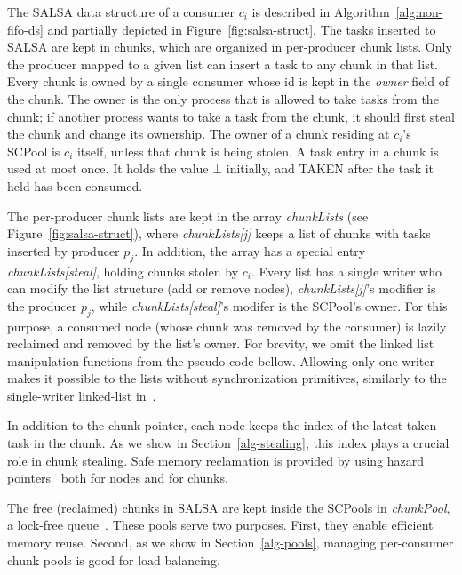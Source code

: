 The SALSA data structure of a consumer $c_i$ is described in Algorithm~\ref{alg:non-fifo-ds} and partially depicted in Figure~\ref{fig:salsa-struct}. 
The tasks inserted to SALSA are kept in chunks, which are organized in per-producer chunk lists. Only the producer mapped to a given list can insert a task to any chunk in that list. Every chunk is owned by a single consumer whose id is kept in the \emph{owner} field of the chunk.
The owner is the only process that is allowed to take tasks from the chunk; if another process wants to take a task from the chunk, it should first steal the chunk and change its ownership. The owner of a chunk
residing at $c_i$'s SCPool is $c_i$ itself, unless that chunk is being stolen. A task entry in a chunk is used at most once. It holds the value $\bot$ initially, and TAKEN after the task it held has been consumed.

The per-producer chunk lists are kept in the array \emph{chunkLists} (see Figure~\ref{fig:salsa-struct}), where \emph{chunkLists[j]} keeps a list of chunks with tasks inserted by producer $p_j$. In addition, the array has a special entry \emph{chunkLists[steal]}, holding chunks stolen by $c_i$. Every list has a single writer who can modify the list structure (add or remove nodes), \emph{chunkLists[j]}'s modifier is the producer $p_j$, while \emph{chunkLists[steal]}'s modifer is the SCPool's owner. For this purpose, a consumed node (whose chunk was removed by the consumer) is lazily reclaimed and removed by the list's owner. For brevity, we omit the linked list manipulation functions from the pseudo-code bellow. Allowing only one writer makes it possible to the lists without synchronization primitives, similarly to the single-writer linked-list in~\cite{Michael:2004:HPS:987524.987595}.

In addition to the chunk pointer, each node keeps the index of the latest taken task in the chunk. As we show in Section~\ref{alg-stealing}, this index plays a crucial role in chunk stealing. Safe memory reclamation is provided by using hazard pointers~\cite{Michael:2004:HPS:987524.987595} both for nodes and for chunks.

The free (reclaimed) chunks in SALSA are kept inside the SCPools in \emph{chunkPool}, a lock-free queue~\cite{Michael:1996:SFP:248052.248106}. These pools serve two purposes. First, they enable efficient memory reuse. Second, as we show in Section~\ref{alg-pools}, managing per-consumer chunk pools is good for load balancing. 	